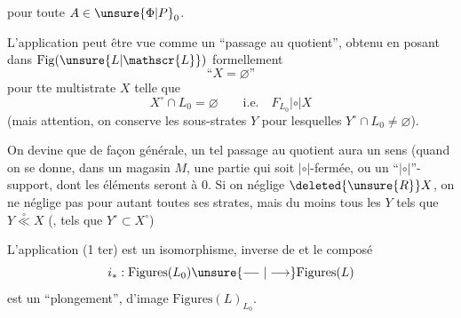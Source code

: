 
pour toute $A\in\unsure{\Phi|P}_0$.

L'application  peut être vue comme un ``passage au quotient'', obtenu en posant dans $\mathrm{Fig}(\unsure{L|\mathscr{L}})$ formellement
\[
\text{``}X=\varnothing\text{''}
\]
pour tte multistrate $X$ telle que
\[
X^\circ\cap L_0=\varnothing\qquad\text{i.e.}\quad F_{L_0}\mathrel{|\circ|}X
\]
(mais attention, on conserve les sous-strates $Y$ pour lesquelles $Y^\circ\cap L_0\ne\varnothing$).

 On devine que de façon générale, un tel passage au quotient aura un sens (quand on se donne, dans un magasin $M$, une partie qui soit $|\circ|$-fermée, ou un ``$|\circ|$''-support, dont les éléments seront  à $0$. Si on néglige $\deleted{\unsure{R}}X$, on ne néglige pas pour autant toutes ses strates, mais du moins tous les $Y$ tels que $Y\mathrel{\overset{\circ}{\ll}}X$ (, tels que $Y^\circ\subset X^\circ$)


L'application (1 ter) est un isomorphisme, inverse de
et le composé
\[
i_*:\mathrm{Figures}(L_0)\unsure{\relbar\joinrel\relbar|\longrightarrow}\mathrm{Figures}(L)
\]
est un ``plongement'', d'image $\mathrm{Figures}(L)_{L_0}$.
